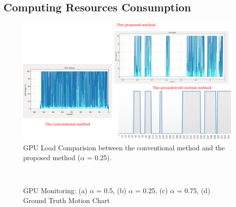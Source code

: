  \subsection{Computing Resources Consumption}
\begin{figure}
\centering
	\includegraphics[scale=0.35]{Figures/gpu_compare.png}
\caption{GPU Load Comparision between the conventional method and the proposed method ($\alpha$ = 0.25).}
\label{fig:gpu}
\end{figure}
\begin{figure}
\centering
{}
\\
\caption{GPU Monitoring: (a) $\alpha$ = 0.5, (b) $\alpha$ = 0.25, (c) $\alpha$ = 0.75, (d) Ground Truth Motion Chart }
\label{fig:gpu_monitor}
\end{figure}
